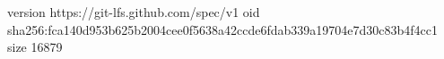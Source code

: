 version https://git-lfs.github.com/spec/v1
oid sha256:fca140d953b625b2004cee0f5638a42ccde6fdab339a19704e7d30c83b4f4cc1
size 16879

